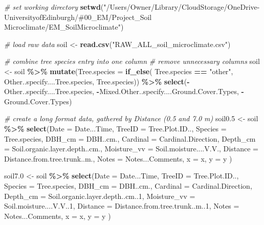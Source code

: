 \documentclass[
]{article}
\newenvironment{Shaded}{\begin{snugshade}}{\end{snugshade}}
\newcommand{\AttributeTok}[1]{\textcolor[rgb]{0.13,0.29,0.53}{#1}}
\newcommand{\CommentTok}[1]{\textcolor[rgb]{0.56,0.35,0.01}{\textit{#1}}}
\newcommand{\DecValTok}[1]{\textcolor[rgb]{0.00,0.00,0.81}{#1}}
\newcommand{\FloatTok}[1]{\textcolor[rgb]{0.00,0.00,0.81}{#1}}
\newcommand{\FunctionTok}[1]{\textcolor[rgb]{0.13,0.29,0.53}{\textbf{#1}}}
\newcommand{\NormalTok}[1]{#1}
\newcommand{\OtherTok}[1]{\textcolor[rgb]{0.56,0.35,0.01}{#1}}
\newcommand{\SpecialCharTok}[1]{\textcolor[rgb]{0.81,0.36,0.00}{\textbf{#1}}}
\newcommand{\StringTok}[1]{\textcolor[rgb]{0.31,0.60,0.02}{#1}}
\begin{document}
\begin{Shaded}
\begin{Highlighting}[]
\CommentTok{\# set working directory }
\FunctionTok{setwd}\NormalTok{(}\StringTok{"/Users/Owner/Library/CloudStorage/OneDrive{-}UniversityofEdinburgh/\#00\_EM/Project\_Soil Microclimate/EM\_SoilMicroclimate"}\NormalTok{)}

\CommentTok{\# load raw data}
\NormalTok{soil }\OtherTok{\textless{}{-}} \FunctionTok{read.csv}\NormalTok{(}\StringTok{"RAW\_ALL\_soil\_microclimate.csv"}\NormalTok{)}

\CommentTok{\# combine tree species entry into one column}
\CommentTok{\# remove unnecessary columns}
\NormalTok{soil }\OtherTok{\textless{}{-}}\NormalTok{ soil }\SpecialCharTok{\%\textgreater{}\%}
  \FunctionTok{mutate}\NormalTok{(}\AttributeTok{Tree.species =} \FunctionTok{if\_else}\NormalTok{(}
\NormalTok{    Tree.species }\SpecialCharTok{==} \StringTok{"other"}\NormalTok{, }
\NormalTok{    Other..specify....Tree.species, }
\NormalTok{    Tree.species)) }\SpecialCharTok{\%\textgreater{}\%}
  \FunctionTok{select}\NormalTok{(}\SpecialCharTok{{-}}\NormalTok{Other..specify....Tree.species, }
         \SpecialCharTok{{-}}\NormalTok{Mixed.Other..specify....Ground.Cover.Types, }
         \SpecialCharTok{{-}}\NormalTok{Ground.Cover.Types)}

\CommentTok{\# create a long format data, gathered by Distance (0.5 and 7.0 m)}
\NormalTok{soil0}\FloatTok{.5} \OtherTok{\textless{}{-}}\NormalTok{ soil }\SpecialCharTok{\%\textgreater{}\%} 
  \FunctionTok{select}\NormalTok{(}\AttributeTok{Date =}\NormalTok{ Date...Time, }
         \AttributeTok{TreeID =}\NormalTok{ Tree.Plot.ID.., }
         \AttributeTok{Species =}\NormalTok{ Tree.species, }
         \AttributeTok{DBH\_cm =}\NormalTok{ DBH..cm., }
         \AttributeTok{Cardinal =}\NormalTok{ Cardinal.Direction, }
         \AttributeTok{Depth\_cm =}\NormalTok{ Soil.organic.layer.depth..cm., }
         \AttributeTok{Moisture\_vv =}\NormalTok{ Soil.moisture....V.V., }
         \AttributeTok{Distance =}\NormalTok{ Distance.from.tree.trunk..m., }
         \AttributeTok{Notes =}\NormalTok{ Notes...Comments, }
         \AttributeTok{x =}\NormalTok{ x, }
         \AttributeTok{y =}\NormalTok{ y}
\NormalTok{         )}

\NormalTok{soil7}\FloatTok{.0} \OtherTok{\textless{}{-}}\NormalTok{ soil }\SpecialCharTok{\%\textgreater{}\%} 
  \FunctionTok{select}\NormalTok{(}\AttributeTok{Date =}\NormalTok{ Date...Time, }
         \AttributeTok{TreeID =}\NormalTok{ Tree.Plot.ID.., }
         \AttributeTok{Species =}\NormalTok{ Tree.species, }
         \AttributeTok{DBH\_cm =}\NormalTok{ DBH..cm., }
         \AttributeTok{Cardinal =}\NormalTok{ Cardinal.Direction, }
         \AttributeTok{Depth\_cm =}\NormalTok{ Soil.organic.layer.depth..cm..}\DecValTok{1}\NormalTok{, }
         \AttributeTok{Moisture\_vv =}\NormalTok{ Soil.moisture....V.V..}\DecValTok{1}\NormalTok{, }
         \AttributeTok{Distance =}\NormalTok{ Distance.from.tree.trunk..m..}\DecValTok{1}\NormalTok{, }
         \AttributeTok{Notes =}\NormalTok{ Notes...Comments, }
         \AttributeTok{x =}\NormalTok{ x, }
         \AttributeTok{y =}\NormalTok{ y}
\NormalTok{  )}


\end{Highlighting}
\end{Shaded}
\end{document}
